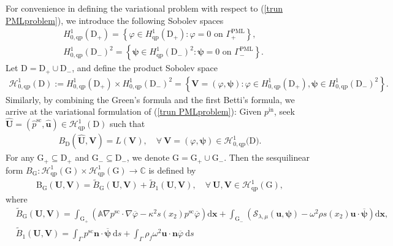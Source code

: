 \documentclass[final,3p,times]{elsarticle}
\begin{document}
For convenience in defining the variational problem with respect to (\ref{trun PMLproblem}), we introduce the following Sobolev spaces
\begin{align*}
	&H_{0, \mathrm{qp}}^1\left(\mathrm{D}_+\right)=\left\{\varphi \in H_{\mathrm{qp}}^1\left(\mathrm{D}_+\right): \varphi=0\right. \left.\text { on } \Gamma_+^{\mathrm{PML}} \right\}, \\
	&H_{0, \mathrm{qp}}^1\left(\mathrm{D}_-\right)^2=\left\{\boldsymbol{\psi} \in H_{\mathrm{qp}}^1\left(\mathrm{D}_-\right)^2: \boldsymbol{\psi}=0\right.  \left.\text { on } \Gamma_-^{\mathrm{PML}} \right\}.
\end{align*}
Let $\mathrm{D} = \mathrm{D}_+ \cup \mathrm{D}_-$, and define the product Sobolev space
\begin{align*}
	\mathscr{H}_{0,\mathrm{qp}}^1(\mathrm{D}):=H_{\mathrm{0,qp}}^1\left(\mathrm{D}_+\right) \times H_{0,\mathrm{qp}}^1\left(\mathrm{D}_-\right)^2=\left\{\boldsymbol{V}=(\varphi, \boldsymbol{\psi}): \varphi \in H_{\mathrm{0,qp}}^1\left(\mathrm{D}_+\right), \boldsymbol{\psi} \in H_{\mathrm{0,qp}}^1\left(\mathrm{D}_-\right)^2\right\}.
\end{align*}
Similarly, by combining the Green's formula and the first Betti's formula, we arrive at the variational formulation of (\ref{trun PMLproblem}): Given $p^\mathrm{in}$, seek $\hat{\boldsymbol{U}}=\left(\hat{p}^\mathrm{sc}, \hat{\boldsymbol{u}}\right) \in \mathscr{H}^1_\mathrm{qp}(\mathrm{D})$ such that  
\begin{align}\label{trun PMLvarproblem}
	B_\mathrm{D}(\hat{\boldsymbol{U}}, \boldsymbol{V})=L(\boldsymbol{V}), \quad \forall~ \boldsymbol{V}=(\varphi, \boldsymbol{\psi}) \in \mathscr{H}_{0,\mathrm{qp}}^1(\mathrm{D)}.
\end{align}
For any $\mathrm{G}_+ \subseteq \mathrm{D}_+$ and $\mathrm{G}_- \subseteq  \mathrm{D}_-$, we denote $\mathrm{G} = \mathrm{G}_+ \cup \mathrm{G}_-$. Then the sesquilinear form $B_\mathrm{G}: \mathscr{H}^1_\mathrm{qp}(\mathrm{G}) \times \mathscr{H}^1_\mathrm{qp}(\mathrm{G}) \rightarrow \mathbb{C}$ is defined by
\begin{align}\label{trun PMLvarleft}
	\mathrm{B}_\mathrm{G}(\boldsymbol{U}, \boldsymbol{V})
	= \widetilde{B}_\mathrm{G}(\boldsymbol{U}, \boldsymbol{V})
	+ \widetilde{B}_1(\boldsymbol{U}, \boldsymbol{V}),\quad \forall~ \boldsymbol{U}, \boldsymbol{V} \in \mathscr{H}^1_\mathrm{qp}(\mathrm{G}),
\end{align}
where
\begin{align*}
	& \widetilde{B}_\mathrm{G}(\boldsymbol{U}, \boldsymbol{V})
	= \int_{\mathrm{G}_+}\left(\mathbb{A} \nabla {p}^\mathrm{sc} \cdot \nabla \overline{\varphi} -\kappa^2 s(x_2) p^\mathrm{sc} \overline{\varphi}\right) \mathrm{d} \boldsymbol{x}
	+ \int_{\mathrm{G}_-}\left(\mathcal{S}_{\lambda, \mu}(\boldsymbol{u}, \boldsymbol{\psi})- \omega^2\rho s(x_2) \boldsymbol{u} \cdot \overline{\boldsymbol{\psi}}\right) \mathrm{d} \boldsymbol{x},\\
	& \widetilde{B}_1(\boldsymbol{U}, \boldsymbol{V})
	= \int_{\Gamma} p^\mathrm{sc} \boldsymbol{n} \cdot \overline{\boldsymbol{\psi}} \mathrm{~d}s
	+ \int_{\Gamma} \rho_f \omega^2 \boldsymbol{u} \cdot \boldsymbol{n} \overline{\varphi} \mathrm{~d}s
\end{align*}
\end{document}
